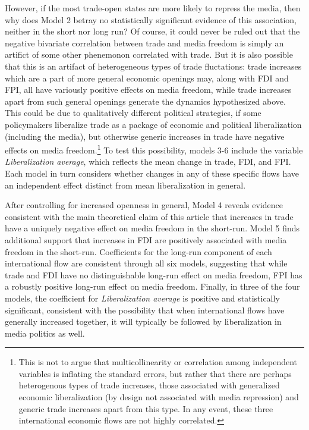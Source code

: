 \documentclass[a4paper]{article}\usepackage[]{graphicx}\usepackage[]{color}
\begin{document}
However, if the most trade-open states are more likely to repress the media, then why does Model 2 betray no statistically significant evidence of this association, neither in the short nor long run? Of course, it could never be ruled out that the negative bivariate correlation between trade and media freedom is simply an artifict of some other phenemonon correlated with trade. But it is also possible that this is an artifact of heterogeneous types of trade fluctations: trade increases which are a part of more general economic openings may, along with FDI and FPI, all have variously positive effects on media freedom, while trade increases apart from such general openings generate the dynamics hypothesized above. This could be due to qualitatively different political strategies, if some policymakers liberalize trade as a package of economic and political liberalization (including the media), but otherwise generic increases in trade have negative effects on media freedom.\footnote{This is not to argue that multicollinearity or correlation among independent variables is inflating the standard errors, but rather that there are perhaps heterogenous types of trade increases, those associated with generalized economic liberalization (by design not associated with media repression) and generic trade increases apart from this type. In any event, these three international economic flows are not highly correlated.} To test this possibility, models 3-6 include the variable \emph{Liberalization average}, which reflects the mean change in trade, FDI, and FPI. Each model in turn considers whether changes in any of these specific flows have an independent effect distinct from mean liberalization in general.

After controlling for increased openness in general, Model 4 reveals evidence consistent with the main theoretical claim of this article that increases in trade have a uniquely negative effect on media freedom in the short-run. Model 5 finds additional support that increases in FDI are positively associated with media freedom in the short-run. Coefficients for the long-run component of each international flow are consistent through all six models, suggesting that while trade and FDI have no distinguishable long-run effect on media freedom, FPI has a robustly positive long-run effect on media freedom. Finally, in three of the four models, the coefficient for \emph{Liberalization average} is positive and statistically significant, consistent with the possibility that when international flows have generally increased together, it will typically be followed by liberalization in media politics as well.
\end{document}
